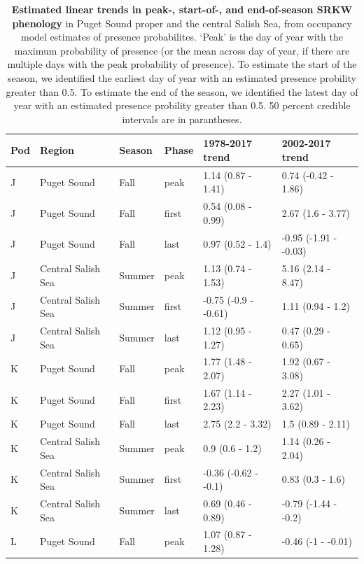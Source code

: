 \documentclass{article}
\begin{document}
\begin{table}[ht]
\centering
\caption{\textbf{Estimated linear trends in peak-, start-of-, and end-of-season SRKW phenology} in Puget Sound proper and the central Salish Sea, from occupancy model estimates of presence probabilites. `Peak' is the day of year with the maximum probability of presence (or the mean across day of year, if there are multiple days with the peak probability of presence). To estimate the start of the season, we identified the earliest day of year with an estimated presence probility greater than 0.5. To estimate the end of the season, we identified the latest day of year with an estimated presence probility greater than 0.5. 50 percent credible intervals are in parantheses.} 
\label{tab:modsz}
\begingroup\footnotesize
\begin{tabular}{|p{}|p{}|p{}|p{}|p{}|p{}|}
  \hline
Pod & Region & Season & Phase & 1978-2017 trend & 2002-2017 trend \\ 
  \hline
J & Puget Sound & Fall & peak & 1.14 (0.87 - 1.41) & 0.74 (-0.42 - 1.86) \\ 
  J & Puget Sound & Fall & first & 0.54 (0.08 - 0.99) & 2.67 (1.6 - 3.77) \\ 
  J & Puget Sound & Fall & last & 0.97 (0.52 - 1.4) & -0.95 (-1.91 - -0.03) \\ 
  J & Central Salish Sea & Summer & peak & 1.13 (0.74 - 1.53) & 5.16 (2.14 - 8.47) \\ 
  J & Central Salish Sea & Summer & first & -0.75 (-0.9 - -0.61) & 1.11 (0.94 - 1.2) \\ 
  J & Central Salish Sea & Summer & last & 1.12 (0.95 - 1.27) & 0.47 (0.29 - 0.65) \\ 
  K & Puget Sound & Fall & peak & 1.77 (1.48 - 2.07) & 1.92 (0.67 - 3.08) \\ 
  K & Puget Sound & Fall & first & 1.67 (1.14 - 2.23) & 2.27 (1.01 - 3.62) \\ 
  K & Puget Sound & Fall & last & 2.75 (2.2 - 3.32) & 1.5 (0.89 - 2.11) \\ 
  K & Central Salish Sea & Summer & peak & 0.9 (0.6 - 1.2) & 1.14 (0.26 - 2.04) \\ 
  K & Central Salish Sea & Summer & first & -0.36 (-0.62 - -0.1) & 0.83 (0.3 - 1.6) \\ 
  K & Central Salish Sea & Summer & last & 0.69 (0.46 - 0.89) & -0.79 (-1.44 - -0.2) \\ 
   \hline
L & Puget Sound & Fall & peak & 1.07 (0.87 - 1.28) & -0.46 (-1 - -0.01) \\ 

\end{tabular}
\end{table}
\end{document}
